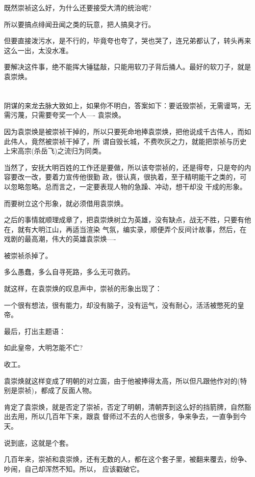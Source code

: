 \documentclass[11pt,a4paper,onecolumn]{article}
\begin{document}
既然崇祯这么好，为什么还要接受大清的统治呢?

所以要搞点绯闻丑闻之类的玩意，把人搞臭才行。

但要直接泼污水，是不行的，毕竟夸也夸了，哭也哭了，连兄弟都认了，转头再来这么一出，太没水准。

要解决这件事，绝不能挥大锤猛敲，只能用软刀子背后捅人。最好的软刀子，就是袁崇焕。

\section[\thesection]{}

阴谋的来龙去脉大致如上，如果你不明白，答案如下：要诋毁崇祯，无需谩骂，无需污蔑，只需要夸奖一个人----
袁崇焕。

因为袁崇焕是被崇祯干掉的，所以只要死命地捧袁崇焕，把他说成千古伟人，而如此伟人，竟然被崇祯干掉了，所
谓自毁长城，不费吹灰之力，就能把崇祯与历史上宋高宗(杀岳飞)之流归为同类。

当然了，安抚大明百姓的工作还是要做，所以该夸崇祯的，还是得夸，只是夸的内容要改一改，要着力宣传他很勤
政，很认真，很执着，至于精明能干之类的，可以忽略忽略。总而言之，一定要表现人物的急躁、冲动，想干却没
干成的形象。

而要树立这个形象，就必须借用袁崇焕。

之后的事情就顺理成章了，把袁崇焕树立为英雄，没有缺点，战无不胜，只要有他在，就有大明江山，再适当渲染
气氛，编实录，顺便弄个反间计故事，然后，在戏剧的最高潮，伟大的英雄袁崇焕----

被崇祯杀掉了。

多么愚蠢，多么自寻死路，多么无可救药。

就这样，在袁崇焕的叹息声中，崇祯的形象出现了：

一个很有想法，很有能力，却没有脑子，没有运气，没有耐心，活活被憋死的皇帝。

最后，打出主题语：

如此皇帝，大明怎能不亡?

收工。

袁崇焕就这样变成了明朝的对立面，由于他被捧得太高，所以但凡跟他作对的(特别是崇祯)，都成了反面人物。

肯定了袁崇焕，就是否定了崇祯，否定了明朝，清朝弄到这么好的挡箭牌，自然豁出去用，所以几百年下来，跟袁
督师过不去的人也很多，争来争去，一直争到今天。

说到底，这就是个套。

几百年来，崇祯和袁崇焕，还有无数的人，都在这个套子里，被翻来覆去，纷争、吵闹，自己却浑然不知。所以，
应该戳破它。
\end{document}
